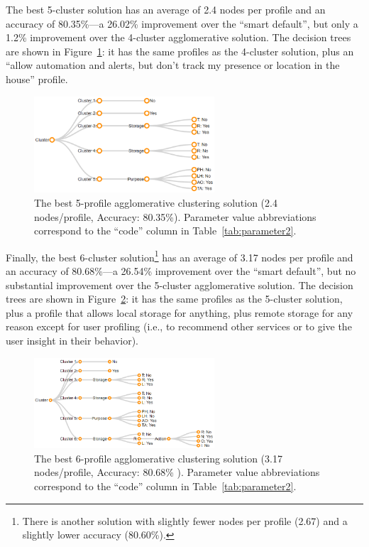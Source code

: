 The best 5-cluster solution has an average of 2.4 nodes per profile and an accuracy of 80.35\%---a 26.02\% improvement over the ``smart default'', but only a 1.2\% improvement over the 4-cluster agglomerative solution. The decision trees are shown in Figure~\ref{fig:conglo_5_profile001}: it has the same profiles as the 4-cluster solution, plus an ``allow automation and alerts, but don't track my presence or location in the house'' profile.

\begin{figure}
	\centering
	\includegraphics[width=0.6\textwidth]{figures/conglo_5_profile001.png}
	\caption{The best 5-profile agglomerative clustering solution (2.4 nodes/profile, Accuracy: 80.35\%). Parameter value abbreviations correspond to the ``code'' column in Table~\ref{tab:parameter2}.}
	\label{fig:conglo_5_profile001}
\end{figure}

Finally, the best 6-cluster solution\footnote{There is another solution with slightly fewer nodes per profile (2.67) and a slightly lower accuracy (80.60\%).} has an average of 3.17 nodes per profile and an accuracy of 80.68\%---a 26.54\% improvement over the ``smart default'', but no substantial improvement over the 5-cluster agglomerative solution. The decision trees are shown in Figure~\ref{fig:conglo_6_profile001}: it has the same profiles as the 5-cluster solution, plus a profile that allows local storage for anything, plus remote storage for any reason except for user profiling (i.e., to recommend other services or to give the user insight in their behavior).

\begin{figure}
	\centering
	\includegraphics[width=0.6\textwidth]{figures/conglo_6_profile001.png}
	\caption{The best 6-profile agglomerative clustering solution (3.17 nodes/profile, Accuracy: 80.68\% ). Parameter value abbreviations correspond to the ``code'' column in Table~\ref{tab:parameter2}.}
	\label{fig:conglo_6_profile001}
\end{figure}


